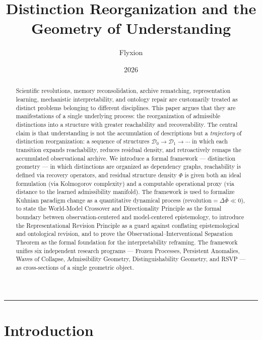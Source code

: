 \documentclass[11pt, a4paper]{article}
\title{%
  \LARGE\bfseries Distinction Reorganization and the\\
  Geometry of Understanding%
}
\author{Flyxion}
\date{2026}
\theoremstyle{plain}
\theoremstyle{definition}
\theoremstyle{remark}
\newcommand{\Dist}{\mathcal{D}}
\begin{document}
\maketitle
\thispagestyle{fancy}

\begin{abstract}
\noindent
Scientific revolutions, memory reconsolidation, archive rematching,
representation learning, mechanistic interpretability, and ontology repair
are customarily treated as distinct problems belonging to different
disciplines. This paper argues that they are manifestations of a single
underlying process: the reorganization of admissible distinctions into
a structure with greater reachability and recoverability.
The central claim is that understanding is not the accumulation of
descriptions but a \emph{trajectory} of distinction reorganization:
a sequence of structures $\Dist_0 \to \Dist_1 \to \cdots$ in which
each transition expands reachability, reduces residual density, and
retroactively remaps the accumulated observational archive.
We introduce a formal framework --- distinction geometry --- in which
distinctions are organized as dependency graphs, reachability is
defined via recovery operators, and residual structure density $\varPhi$
is given both an ideal formulation (via Kolmogorov complexity) and a
computable operational proxy (via distance to the learned admissibility
manifold).
The framework is used to formalize Kuhnian paradigm change as a
quantitative dynamical process ($\text{revolution} = \Delta\bar\varPhi \ll 0$),
to state the World-Model Crossover and Directionality Principle as
the formal boundary between observation-centered and model-centered
epistemology, to introduce the Representational Revision Principle
as a guard against conflating epistemological and ontological revision,
and to prove the Observational--Interventional Separation Theorem as
the formal foundation for the interpretability reframing.
The framework unifies six independent research programs ---
Frozen Processes, Persistent Anomalies, Waves of Collapse,
Admissibility Geometry, Distinguishability Geometry, and RSVP ---
as cross-sections of a single geometric object.
\end{abstract}

\newpage

\tableofcontents

\bigskip\hrule\bigskip

\section{Introduction}
\label{sec:intro}
\end{document}
